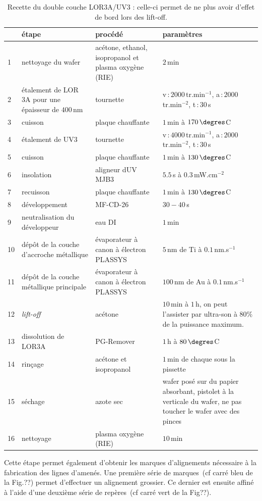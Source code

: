\begin{table}
\begin{center}
\begin{tabular}{|p{0.5cm}|p{4cm}|p{4cm}|p{3cm}|}
  \hline
\,& \textbf{étape} & \textbf{procédé} & \textbf{paramètres} \tabularnewline
\hline
1 &  nettoyage du wafer & acétone, ethanol, isopropanol et plasma oxygène (RIE)& $2\,$min \tabularnewline
\hline
 2 & étalement de LOR 3A pour une épaisseur de $400\,$nm& tournette & v\,:\,$2000\,$tr.min$^{-1}$, a\,:\,$2000\,$tr.min$^{-2}$, t\,:\,$30\,$s \tabularnewline
\hline
 3 & cuisson & plaque chauffante & $1\,$min à $170\,\degres$C \tabularnewline
\hline
4 & étalement de UV3 & tournette & v\,:\,$4000\,$tr.min$^{-1}$, a\,:\,$2000\,$tr.min$^{-2}$, t\,:\,$30\,$s \tabularnewline
\hline
5 & cuisson & plaque chauffante & $1\,$min à $130\,\degres$C \tabularnewline
\hline
6 & insolation & aligneur dUV MJB3 & $5.5\,$s à $0.3\,$mW.cm$^{-2}$\tabularnewline
\hline
7 & recuisson & plaque chauffante & $1\,$min à $130\,\degres$C \tabularnewline
\hline
8 & développement & MF-CD-26 & $30-40\,$s\tabularnewline
\hline
9 & neutralisation du développeur & eau DI & $1\,$min\tabularnewline
\hline
10 & dépôt de la couche d'accroche métallique & évaporateur à canon à électron PLASSYS & $5\,$nm de Ti à $0.1\,$nm.s$^{-1}$ \tabularnewline
\hline
11 & dépôt de la couche métallique principale & évaporateur à canon à électron PLASSYS & $100\,$nm de Au à $0.1\,$nm.s$^{-1}$ \tabularnewline
\hline
12 & \textit{lift-off} & acétone & $10\,$min à $1\,$h, on peut l'assister par ultra-son à $80\%$ de la puissance maximum. \tabularnewline
\hline
 13 & dissolution de LOR3A & PG-Remover & $1\,$h à $80\,\degres$C \tabularnewline
\hline
14 & rinçage & acétone et isopropanol & $1\,$min de chaque sous la pissette\tabularnewline
\hline
15 & séchage & azote sec & wafer posé sur du papier absorbant, pistolet à la verticale du wafer, ne pas toucher le wafer avec des pinces\tabularnewline
\hline
16 & nettoyage & plasma oxygène (RIE)& $10\,$min\tabularnewline
\hline
\end{tabular}
\caption{Recette du double couche LOR3A/UV3 : celle-ci permet de ne plus avoir d'effet de bord lors des lift-off.}
\label{tab_recette}
\end{center}
\end{table}


Cette étape permet également d'obtenir les marques d'alignements nécessaire à la fabrication des lignes d'amenés. Une première série de marques~(cf carré bleu de la Fig.??) permet d'effectuer un alignement grossier. Ce dernier est ensuite affiné à l'aide d'une deuxième série de repères~(cf carré vert de la Fig??).

